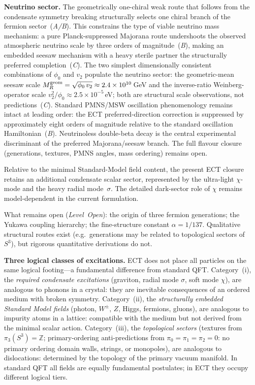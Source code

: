 \documentclass[11pt,a4paper]{article}
\begin{document}
\textbf{Neutrino sector.}
The geometrically one-chiral weak route that follows from the condensate symmetry breaking structurally selects one chiral branch of the fermion sector~(\emph{A/B}).
This constrains the type of viable neutrino mass mechanism: a pure Planck-suppressed Majorana route undershoots the observed atmospheric neutrino scale by three orders of magnitude~(\emph{B}), making an embedded seesaw mechanism with a heavy sterile partner the structurally preferred completion~(\emph{C}).
The two simplest dimensionally consistent combinations of $\phi_0$ and $v_2$ populate the neutrino sector: the geometric-mean seesaw scale $M_R^{\rm geom}=\sqrt{\phi_0\,v_2}\approx 2.4\times10^{10}$\,GeV and the inverse-ratio Weinberg-operator scale $v_2^2/\phi_0\approx 2.5\times10^{-5}$\,eV; both are structural scale observations, not predictions~(\emph{C}).
Standard PMNS/MSW oscillation phenomenology remains intact at leading order: the ECT preferred-direction correction is suppressed by approximately eight orders of magnitude relative to the standard oscillation Hamiltonian~(\emph{B}).
Neutrinoless double-beta decay is the central experimental discriminant of the preferred Majorana/seesaw branch.
The full flavour closure (generations, textures, PMNS angles, mass ordering) remains open.

Relative to the minimal Standard-Model field content, the present ECT closure retains an additional condensate scalar sector, represented by the ultra-light $\chi$-mode and the heavy radial mode~$\sigma$. The detailed dark-sector role of $\chi$ remains model-dependent in the current formulation.

What remains open (\emph{Level~Open}): the origin of three fermion generations; the Yukawa coupling hierarchy; the fine-structure constant $\alpha = 1/137$. Qualitative structural routes exist (e.g.\ generations may be related to topological sectors of $S^3$), but rigorous quantitative derivations do not.

\textbf{Three logical classes of excitations.}
ECT does not place all particles on the same logical footing---a fundamental difference from standard QFT.
Category~(i), the \emph{required condensate excitations} (graviton, radial mode $\sigma$, soft mode $\chi$), are analogous to phonons in a crystal: they are inevitable consequences of an ordered medium with broken symmetry.
Category~(ii), the \emph{structurally embedded Standard Model fields} (photon, $W^\pm$, $Z$, Higgs, fermions, gluons), are analogous to impurity atoms in a lattice: compatible with the medium but not derived from the minimal scalar action.
Category~(iii), the \emph{topological sectors} (textures from $\pi_3(S^3)=\mathbb{Z}$; primary-ordering anti-predictions from $\pi_0=\pi_1=\pi_2=0$: no primary ordering domain walls, strings, or monopoles), are analogous to dislocations: determined by the topology of the primary vacuum manifold.
In standard QFT all fields are equally fundamental postulates; in ECT they occupy different logical tiers.
\end{document}
